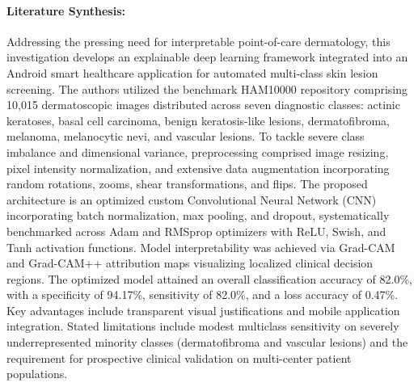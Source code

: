 \paragraph{Literature Synthesis:} Addressing the pressing need for interpretable point-of-care dermatology, this investigation develops an explainable deep learning framework integrated into an Android smart healthcare application for automated multi-class skin lesion screening. The authors utilized the benchmark HAM10000 repository comprising 10,015 dermatoscopic images distributed across seven diagnostic classes: actinic keratoses, basal cell carcinoma, benign keratosis-like lesions, dermatofibroma, melanoma, melanocytic nevi, and vascular lesions. To tackle severe class imbalance and dimensional variance, preprocessing comprised image resizing, pixel intensity normalization, and extensive data augmentation incorporating random rotations, zooms, shear transformations, and flips. The proposed architecture is an optimized custom Convolutional Neural Network (CNN) incorporating batch normalization, max pooling, and dropout, systematically benchmarked across Adam and RMSprop optimizers with ReLU, Swish, and Tanh activation functions. Model interpretability was achieved via Grad-CAM and Grad-CAM++ attribution maps visualizing localized clinical decision regions. The optimized model attained an overall classification accuracy of 82.0\%, with a specificity of 94.17\%, sensitivity of 82.0\%, and a loss accuracy of 0.47\%. Key advantages include transparent visual justifications and mobile application integration. Stated limitations include modest multiclass sensitivity on severely underrepresented minority classes (dermatofibroma and vascular lesions) and the requirement for prospective clinical validation on multi-center patient populations.

